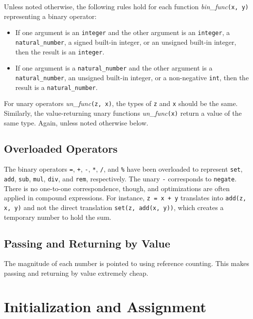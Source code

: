 \documentclass[a4paper]{article}
\begin{document}
Unless noted otherwise, the following rules hold for each function \emph{bin\_func}\texttt{(x, y)} representing a binary operator:
\begin{itemize}
\item If one argument is an \texttt{integer} and the other argument is an \texttt{integer}, a \texttt{natural\_number}, a signed built-in integer, or an unsigned built-in integer, then the result is an \texttt{integer}.
\item If one argument is a \texttt{natural\_number} and the other argument is a \texttt{natural\_number}, an unsigned built-in integer, or a non-negative \texttt{int}, then the result is a \texttt{natural\_number}.
\end{itemize}

For unary operators \emph{un\_func}\texttt{(z, x)}, the types of \texttt{z} and \texttt{x} should be the same. Similarly, the value-returning unary functions \emph{un\_func}\texttt{(x)} return a value of the same type. Again, unless noted otherwise below.

\subsection{Overloaded Operators}

The binary operators \texttt{=}, \texttt{+}, \texttt{-}, \texttt{*}, \texttt{/}, and \texttt{\%} have been overloaded to represent \texttt{set}, \texttt{add}, \texttt{sub}, \texttt{mul}, \texttt{div}, and \texttt{rem}, respectively. The unary \texttt{-} corresponds to \texttt{negate}. There is no one-to-one correspondence, though, and optimizations are often applied in compound expressions. For instance, \texttt{z = x + y} translates into \texttt{add(z, x, y)} and not the direct translation \texttt{set(z, add(x, y))}, which creates a temporary number to hold the sum.

\subsection{Passing and Returning by Value}

The magnitude of each number is pointed to using reference counting. This makes passing and returning by value extremely cheap.


\section{Initialization and Assignment}
\end{document}
